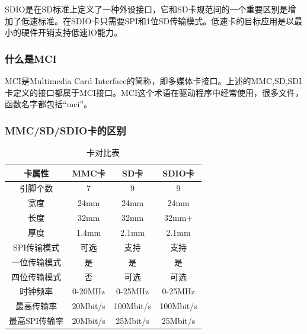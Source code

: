 SDIO是在SD标准上定义了一种外设接口，它和SD卡规范间的一个重要区别是增加了低速标准。在SDIO卡只需要SPI和1位SD传输模式。低速卡的目标应用是以最小的硬件开销支持低速IO能力。

\subsubsection{什么是MCI}

MCI是Multimedia Card Interface的简称，即多媒体卡接口。上述的MMC,SD,SDI卡定义的接口都属于MCI接口。MCI这个术语在驱动程序中经常使用，很多文件，函数名字都包括“mci”。

\subsubsection{MMC/SD/SDIO卡的区别}

\begin{table}[h]
    \centering
\begin{tabular}{|c|c|c|c|}
    \hline
    卡属性&MMC卡&SD卡&SDIO卡\\
    \hline
    引脚个数&7&9&9\\
    \hline
    宽度&24mm&24mm&24mm\\
    \hline
    长度&32mm&32mm&32mm+\\
    \hline
    厚度&1.4mm&2.1mm&2.1mm\\
    \hline
    SPI传输模式&可选&支持&支持\\
    \hline
    一位传输模式&是&是&是\\
    \hline
    四位传输模式&否&可选&可选\\
    \hline
    时钟频率&0-20MHz&0-25MHz&0-25MHz\\
    \hline
    最高传输率&20Mbit/s&100Mbit/s&100Mbit/s\\
    \hline
    最高SPI传输率&20Mbit/s&25Mbit/s&25Mbit/s\\
    \hline
  \end{tabular}
  \caption{卡对比表}
\end{table}

